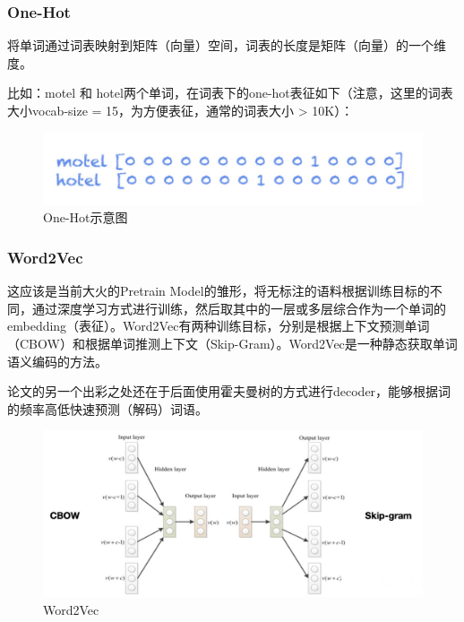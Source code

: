 \documentclass{article} %
\begin{document}
\subsubsection{One-Hot}
将单词通过词表映射到矩阵（向量）空间，词表的长度是矩阵（向量）的一个维度。

比如：motel 和 hotel两个单词，在词表下的one-hot表征如下（注意，这里的词表大小vocab-size = 15，为方便表征，通常的词表大小 > 10K）：

\begin{figure}[h] %
    \centering %
    \includegraphics[width=\textwidth]{2.png} %
    \caption{One-Hot示意图} %
    \label{fig:example} %
\end{figure}
\FloatBarrier

\subsubsection{Word2Vec}
这应该是当前大火的Pretrain Model的雏形，将无标注的语料根据训练目标的不同，通过深度学习方式进行训练，然后取其中的一层或多层综合作为一个单词的embedding（表征）。Word2Vec有两种训练目标，分别是根据上下文预测单词（CBOW）和根据单词推测上下文（Skip-Gram）。Word2Vec是一种静态获取单词语义编码的方法。

论文的另一个出彩之处还在于后面使用霍夫曼树的方式进行decoder，能够根据词的频率高低快速预测（解码）词语。
\begin{figure}[h] %
    \centering %
    \includegraphics[width=\textwidth]{3.png} %
    \caption{Word2Vec} %
    \label{fig:example} %
\end{figure}
\FloatBarrier
\end{document}
